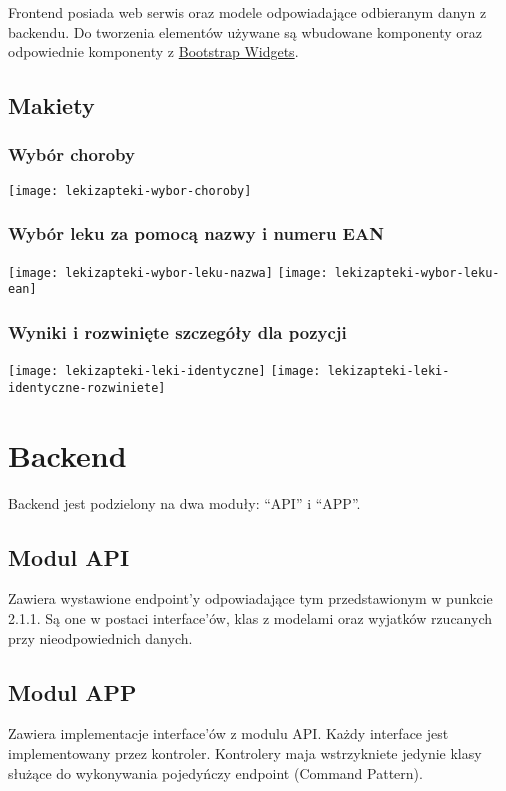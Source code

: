 \documentclass{article}
\begin{document}
  Frontend posiada web serwis oraz modele odpowiadające odbieranym danyn z backendu.
  Do tworzenia elementów używane są wbudowane komponenty oraz odpowiednie komponenty z
  \href{https://ng-bootstrap.github.io/#/home}{Bootstrap Widgets}.

    \subsection{Makiety}
      \subsubsection{Wybór choroby}
      \texttt{[image: lekizapteki-wybor-choroby]}

      \subsubsection{Wybór leku za pomocą nazwy i numeru EAN}
      \texttt{[image: lekizapteki-wybor-leku-nazwa]}
      \texttt{[image: lekizapteki-wybor-leku-ean]}

      \subsubsection{Wyniki i rozwinięte szczegóły dla pozycji}
      \texttt{[image: lekizapteki-leki-identyczne]}
      \texttt{[image: lekizapteki-leki-identyczne-rozwiniete]}

  \section{Backend}
  Backend jest podzielony na dwa moduły: ``API'' i ``APP''.

    \subsection{Modul API}
    Zawiera wystawione endpoint'y odpowiadające tym przedstawionym w punkcie 2.1.1.
    Są one w postaci interface'ów, klas z modelami oraz wyjatków rzucanych przy nieodpowiednich danych.

    \subsection{Modul APP}
    Zawiera implementacje interface'ów z modulu API.
    Każdy interface jest implementowany przez kontroler.
    Kontrolery maja wstrzykniete jedynie klasy służące do wykonywania pojedyńczy endpoint (Command Pattern).
\end{document}
